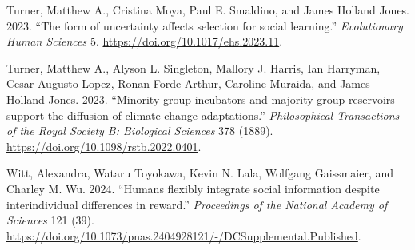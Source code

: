 \documentclass[
  letterpaper,
  DIV=11,
  numbers=noendperiod]{scrartcl}
\newlength{\cslhangindent}
\newenvironment{CSLReferences}[2] %
 {\begin{list}{}{%
  \setlength{\itemindent}{0pt}
  \setlength{\leftmargin}{0pt}
  \setlength{\parsep}{0pt}
  \ifodd #1
   \setlength{\leftmargin}{\cslhangindent}
   \setlength{\itemindent}{-1\cslhangindent}
  \fi
  \setlength{\itemsep}{#2\baselineskip}}}
 {\end{list}}
\begin{document}
\begin{CSLReferences}{1}{0}
Turner, Matthew A., Cristina Moya, Paul E. Smaldino, and James Holland
Jones. 2023. {``{The form of uncertainty affects selection for social
learning}.''} \emph{Evolutionary Human Sciences} 5.
\url{https://doi.org/10.1017/ehs.2023.11}.

Turner, Matthew A., Alyson L. Singleton, Mallory J. Harris, Ian
Harryman, Cesar Augusto Lopez, Ronan Forde Arthur, Caroline Muraida, and
James Holland Jones. 2023. {``{Minority-group incubators and
majority-group reservoirs support the diffusion of climate change
adaptations}.''} \emph{Philosophical Transactions of the Royal Society
B: Biological Sciences} 378 (1889).
\url{https://doi.org/10.1098/rstb.2022.0401}.

Witt, Alexandra, Wataru Toyokawa, Kevin N. Lala, Wolfgang Gaissmaier,
and Charley M. Wu. 2024. {``{Humans flexibly integrate social
information despite interindividual differences in reward}.''}
\emph{Proceedings of the National Academy of Sciences} 121 (39).
\url{https://doi.org/10.1073/pnas.2404928121/-/DCSupplemental.Published}.

\end{CSLReferences}
\end{document}
